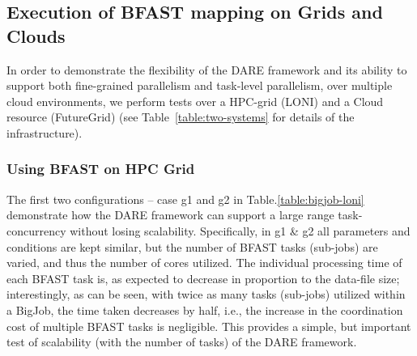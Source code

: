 \documentclass{cpeauth}
\begin{document}


\subsection{Execution of BFAST mapping on Grids and Clouds}

In order to demonstrate the flexibility of the DARE framework and its
ability to support both fine-grained parallelism and task-level
parallelism, over multiple cloud environments, we perform tests over a
HPC-grid (LONI) and a Cloud resource (FutureGrid) (see
Table~\ref{table:two-systems} for details of the infrastructure).


\subsubsection{Using BFAST on HPC Grid}

The first two configurations -- case g1 and g2 in
Table.\ref{table:bigjob-loni} demonstrate how the DARE framework can
support a large range task-concurrency without losing scalability.
Specifically, in g1 \& g2 all parameters and conditions are kept
similar, but the number of BFAST tasks (sub-jobs) are varied, and thus
the number of cores utilized.  The individual processing time of each
BFAST task is, as expected to decrease in proportion to the data-file
size; interestingly, as can be seen, with twice as many tasks
(sub-jobs) utilized within a BigJob, the time taken decreases by half,
i.e., the increase in the coordination cost of multiple BFAST tasks is
negligible. This provides a simple, but important test of scalability
(with the number of tasks) of the DARE framework.  
\end{document}
